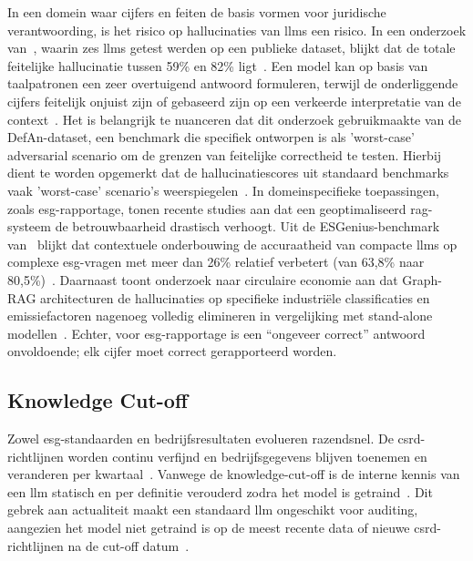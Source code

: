 In een domein waar cijfers en feiten de basis vormen voor juridische verantwoording, is het risico op hallucinaties van \glspl{llm} een risico. In een onderzoek van~\textcite{Rahman2024}, waarin zes \glspl{llm} getest werden op een publieke dataset, blijkt dat de totale feitelijke hallucinatie tussen 59\% en 82\% ligt~\autocite{Rahman2024}. Een model kan op basis van taalpatronen een zeer overtuigend antwoord formuleren, terwijl de onderliggende cijfers feitelijk onjuist zijn of gebaseerd zijn op een verkeerde interpretatie van de context~\autocite{Alansari2025}. Het is belangrijk te nuanceren dat dit onderzoek gebruikmaakte van de DefAn-dataset, een benchmark die specifiek ontworpen is als 'worst-case' adversarial scenario om de grenzen van feitelijke correctheid te testen. Hierbij dient te worden opgemerkt dat de hallucinatiescores uit standaard benchmarks vaak 'worst-case' scenario's weerspiegelen~\autocite{Rahman2024}. In domeinspecifieke toepassingen, zoals \gls{esg}-rapportage, tonen recente studies aan dat een geoptimaliseerd \gls{rag}-systeem de betrouwbaarheid drastisch verhoogt. Uit de ESGenius-benchmark van~\textcite{He2025} blijkt dat contextuele onderbouwing de accuraatheid van compacte \glspl{llm} op complexe \gls{esg}-vragen met meer dan 26\% relatief verbetert (van 63,8\% naar 80,5\%)~\autocite{He2025}. Daarnaast toont onderzoek naar circulaire economie aan dat Graph-RAG architecturen de hallucinaties op specifieke industriële classificaties en emissiefactoren nagenoeg volledig elimineren in vergelijking met stand-alone modellen~\autocite{Zhao2025}. Echter, voor \gls{esg}-rapportage is een ``ongeveer correct'' antwoord onvoldoende; elk cijfer moet correct gerapporteerd worden.

\subsection{Knowledge Cut-off}

Zowel \gls{esg}-standaarden en bedrijfsresultaten evolueren razendsnel. De \gls{csrd}-richtlijnen worden continu verfijnd en bedrijfsgegevens blijven toenemen en veranderen per kwartaal~\autocite{Fornasari2024}. Vanwege de \gls{knowledge-cut-off} is de interne kennis van een \gls{llm} statisch en per definitie verouderd zodra het model is getraind~\autocite{Wang2025}. Dit gebrek aan actualiteit maakt een standaard \gls{llm} ongeschikt voor auditing, aangezien het model niet getraind is op de meest recente data of nieuwe \gls{csrd}-richtlijnen na de cut-off datum~\autocite{Wang2025}.

